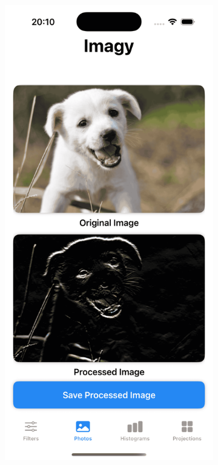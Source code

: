 \documentclass[a4paper]{article}
\begin{document}
\begin{figure}[H]
\begin{subfigure}{0.2\textwidth}
        \label{fig:custom_horizontal}
    \end{subfigure}
    \hfill
    \begin{subfigure}{0.2\textwidth}
        \centering
        \includegraphics[width=\linewidth]{images/dog_custom_horizontal.png}

\end{subfigure}
\end{figure}
\end{document}
